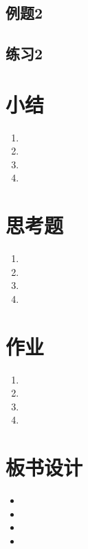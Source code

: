 \begin{CJK}{UTF8}{gkai}
\subsection{例题2}

\subsection{练习2}

\section{小结}
\begin{enumerate}
\item
\item
\item
\item 
\end{enumerate}

\section{思考题}
\begin{enumerate}
\item
\item
\item
\item 
\end{enumerate}

\section{作业}
\begin{enumerate}
\item
\item
\item
\item 
\end{enumerate}

\section{板书设计}
\begin{itemize}
\item 
\item
\item
\item
\end{itemize}

\end{CJK}
